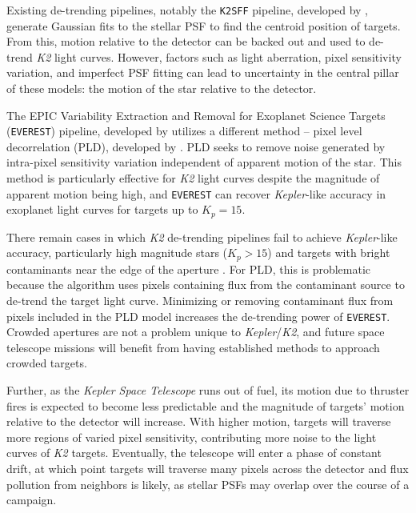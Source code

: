 \documentclass[12pt,preprint]{aastex}
\begin{document}
Existing de-trending pipelines, notably the \texttt{K2SFF} pipeline, developed by \cite{2014PASP..126..948V}, generate Gaussian fits to the stellar PSF to find the centroid position of targets. From this, motion relative to the detector can be backed out and used to de-trend \textit{K2} light curves. However, factors such as light aberration, pixel sensitivity variation, and imperfect PSF fitting can lead to uncertainty in the central pillar of these models: the motion of the star relative to the detector.

The EPIC Variability Extraction and Removal for Exoplanet Science Targets (\texttt{EVEREST}) pipeline, developed by \cite{2016AJ....152..100L, 2017arXiv170205488L} utilizes a different method -- pixel level decorrelation (PLD), developed by \cite{0004-637X-805-2-132}. PLD seeks to remove noise generated by intra-pixel sensitivity variation independent of apparent motion of the star. This method is particularly effective for \textit{K2} light curves despite the magnitude of apparent motion being high, and \texttt{EVEREST} can recover \textit{Kepler}-like accuracy in exoplanet light curves for targets up to $K_p = 15$.

There remain cases in which \textit{K2} de-trending pipelines fail to achieve \textit{Kepler}-like accuracy, particularly high magnitude stars ($K_p > 15$) and targets with bright contaminants near the edge of the aperture \citep{2017arXiv170205488L}. For PLD, this is problematic because the algorithm uses pixels containing flux from the contaminant source to de-trend the target light curve. Minimizing or removing contaminant flux from pixels included in the PLD model increases the de-trending power of \texttt{EVEREST}. Crowded apertures are not a problem unique to \textit{Kepler}/\textit{K2}, and future space telescope missions will benefit from having established methods to approach crowded targets.

Further, as the \textit{Kepler Space Telescope} runs out of fuel, its motion due to thruster fires is expected to become less predictable and the magnitude of targets' motion relative to the detector will increase. With higher motion, targets will traverse more regions of varied pixel sensitivity, contributing more noise to the light curves of \textit{K2} targets. Eventually, the telescope will enter a phase of constant drift, at which point targets will traverse many pixels across the detector and flux pollution from neighbors is likely, as stellar PSFs may overlap over the course of a campaign.
\end{document}
